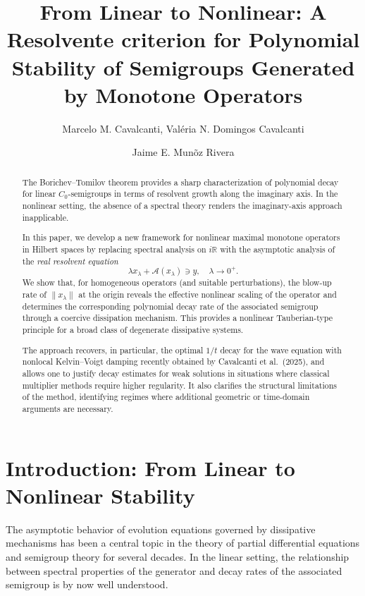 \documentclass[11pt,reqno]{amsart}
\title[Resolvent Estimates for Nonlinear Semigroups]{From Linear to Nonlinear: A Resolvente criterion for Polynomial Stability of Semigroups Generated by Monotone Operators}
\author{Marcelo M. Cavalcanti, Val\'eria N. Domingos Cavalcanti}
\author{Jaime E. Mun\~oz Rivera}
\theoremstyle{remark}
\begin{document}
\begin{abstract}
The Borichev--Tomilov theorem \cite{BT2010} provides a sharp characterization
of polynomial decay for linear $C_0$-semigroups in terms of resolvent growth
along the imaginary axis. In the nonlinear setting, the absence of a spectral
theory renders the imaginary-axis approach inapplicable.

In this paper, we develop a new framework for nonlinear maximal monotone
operators in Hilbert spaces by replacing spectral analysis on $i\mathbb{R}$
with the asymptotic analysis of the \textit{real resolvent equation}
\[
\lambda x_\lambda + \mathcal{A}(x_\lambda) \ni y,
\quad \lambda \to 0^+.
\]
We show that, for homogeneous operators (and suitable perturbations),
the blow-up rate of $\|x_\lambda\|$ at the origin reveals the effective
nonlinear scaling of the operator and determines the corresponding
polynomial decay rate of the associated semigroup through a coercive
dissipation mechanism. This provides a nonlinear Tauberian-type principle
for a broad class of degenerate dissipative systems.

The approach recovers, in particular, the optimal $1/t$ decay for the wave
equation with nonlocal Kelvin--Voigt damping recently obtained by Cavalcanti
et al.\ (2025), and allows one to justify decay estimates for weak solutions
in situations where classical multiplier methods require higher regularity.
It also clarifies the structural limitations of the method, identifying
regimes where additional geometric or time-domain arguments are necessary.
\end{abstract}



\maketitle
\tableofcontents

\section{Introduction: From Linear to Nonlinear Stability}
\label{sec:intro}

The asymptotic behavior of evolution equations governed by dissipative mechanisms has been a central topic in the theory of partial differential equations and semigroup theory for several decades. In the linear setting, the relationship between spectral properties of the generator and decay rates of the associated semigroup is by now well understood.
\end{document}
